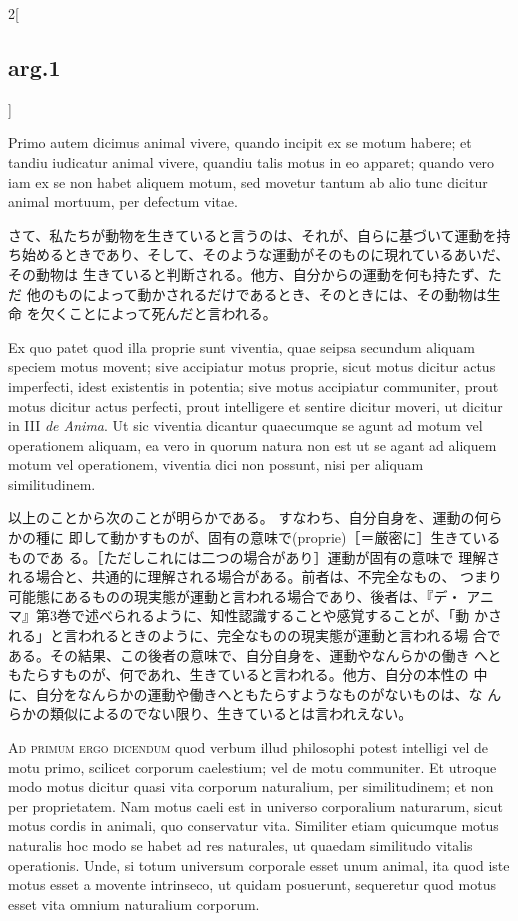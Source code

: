 \documentclass[paper=a4paper,fontsize=10pt,jafontsize=9pt,titlepage]{jlreq}
\begin{document}
\begin{paracol}{2}[\subsection{arg.1}]
\switchcolumn*


Primo autem dicimus animal vivere, quando
 incipit ex se motum habere; et tandiu iudicatur animal vivere, quandiu
 talis motus in eo apparet; quando vero iam ex se non habet aliquem
 motum, sed movetur tantum ab alio tunc dicitur animal mortuum, per
 defectum vitae.

\switchcolumn

さて、私たちが動物を生きていると言うのは、それが、自らに基づいて運動を持
 ち始めるときであり、そして、そのような運動がそのものに現れているあいだ、その動物は
 生きていると判断される。他方、自分からの運動を何も持たず、ただ
 他のものによって動かされるだけであるとき、そのときには、その動物は生命
 を欠くことによって死んだと言われる。

\switchcolumn*


Ex quo patet quod illa proprie sunt viventia, quae
 seipsa secundum aliquam speciem motus movent; sive accipiatur motus
 proprie, sicut motus dicitur actus imperfecti, idest existentis in
 potentia; sive motus accipiatur communiter, prout motus dicitur actus
 perfecti, prout intelligere et sentire dicitur moveri, ut dicitur in
 III {\itshape de Anima}. Ut sic viventia dicantur quaecumque se agunt ad motum vel
 operationem aliquam, ea vero in quorum natura non est ut se agant ad
 aliquem motum vel operationem, viventia dici non possunt, nisi per
 aliquam similitudinem.

\switchcolumn

以上のことから次のことが明らかである。
すなわち、自分自身を、運動の何らかの種に
 即して動かすものが、固有の意味で(proprie)［＝厳密に］生きているものであ
 る。［ただしこれには二つの場合があり］運動が固有の意味で
 理解される場合と、共通的に理解される場合がある。前者は、不完全なもの、
 つまり可能態にあるものの現実態が運動と言われる場合であり、後者は、『デ・
 アニマ』第3巻で述べられるように、知性認識することや感覚することが、「動
 かされる」と言われるときのように、完全なものの現実態が運動と言われる場
 合である。その結果、この後者の意味で、自分自身を、運動やなんらかの働き
 へともたらすものが、何であれ、生きていると言われる。他方、自分の本性の
 中に、自分をなんらかの運動や働きへともたらすようなものがないものは、な
 んらかの類似によるのでない限り、生きているとは言われえない。

\switchcolumn*[\subsection{ad.1}]


{\scshape Ad primum ergo dicendum} quod verbum illud philosophi potest
 intelligi vel de motu primo, scilicet corporum caelestium; vel de motu
 communiter. Et utroque modo motus dicitur quasi vita corporum
 naturalium, per similitudinem; et non per proprietatem. Nam motus caeli
 est in universo corporalium naturarum, sicut motus cordis in animali,
 quo conservatur vita. Similiter etiam quicumque motus naturalis hoc
 modo se habet ad res naturales, ut quaedam similitudo vitalis
 operationis. Unde, si totum universum corporale esset unum animal, ita
 quod iste motus esset a movente intrinseco, ut quidam posuerunt,
 sequeretur quod motus esset vita omnium naturalium corporum.


\end{paracol}
\end{document}
